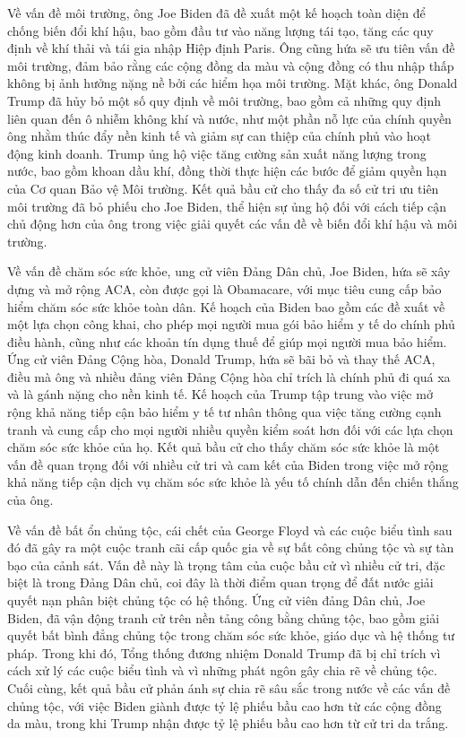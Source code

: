 \documentclass[14pt, a4paper]{article}
\numberwithin{equation}{section}
\numberwithin{figure}{section}
\numberwithin{dl}{section}
\numberwithin{md}{section}
\numberwithin{bd}{section}
\numberwithin{dn}{section}
\numberwithin{hq}{section}
\begin{document}
    Về vấn đề môi trường, ông Joe Biden đã đề xuất một kế hoạch toàn diện để chống biến đổi khí hậu, bao gồm đầu tư vào năng lượng tái tạo, tăng các quy định về khí thải và tái gia nhập Hiệp định Paris. 
    Ông cũng hứa sẽ ưu tiên vấn đề môi trường, đảm bảo rằng các cộng đồng da màu và cộng đồng có thu nhập thấp không bị ảnh hưởng nặng nề bởi các hiểm họa môi trường.
    Mặt khác, ông Donald Trump đã hủy bỏ một số quy định về môi trường, bao gồm cả những quy định liên quan đến ô nhiễm không khí và nước, như một phần nỗ lực của chính quyền ông nhằm thúc đẩy nền kinh tế và giảm sự can thiệp của chính phủ vào hoạt động kinh doanh. 
    Trump ủng hộ việc tăng cường sản xuất năng lượng trong nước, bao gồm khoan dầu khí, đồng thời thực hiện các bước để giảm quyền hạn của Cơ quan Bảo vệ Môi trường.
    Kết quả bầu cử cho thấy đa số cử tri ưu tiên môi trường đã bỏ phiếu cho Joe Biden, thể hiện sự ủng hộ đối với cách tiếp cận chủ động hơn của ông trong việc giải quyết các vấn đề về biến đổi khí hậu và môi trường.

    Về vấn đề chăm sóc sức khỏe, ung cử viên Đảng Dân chủ, Joe Biden, hứa sẽ xây dựng và mở rộng ACA, còn được gọi là Obamacare, với mục tiêu cung cấp bảo hiểm chăm sóc sức khỏe toàn dân. 
    Kế hoạch của Biden bao gồm các đề xuất về một lựa chọn công khai, cho phép mọi người mua gói bảo hiểm y tế do chính phủ điều hành, cũng như các khoản tín dụng thuế để giúp mọi người mua bảo hiểm.
    Ứng cử viên Đảng Cộng hòa, Donald Trump, hứa sẽ bãi bỏ và thay thế ACA, điều mà ông và nhiều đảng viên Đảng Cộng hòa chỉ trích là chính phủ đi quá xa và là gánh nặng cho nền kinh tế. 
    Kế hoạch của Trump tập trung vào việc mở rộng khả năng tiếp cận bảo hiểm y tế tư nhân thông qua việc tăng cường cạnh tranh và cung cấp cho mọi người nhiều quyền kiểm soát hơn đối với các lựa chọn chăm sóc sức khỏe của họ.
    Kết quả bầu cử cho thấy chăm sóc sức khỏe là một vấn đề quan trọng đối với nhiều cử tri và cam kết của Biden trong việc mở rộng khả năng tiếp cận dịch vụ chăm sóc sức khỏe là yếu tố chính dẫn đến chiến thắng của ông.

    Về vấn đề bất ổn chủng tộc, cái chết của George Floyd và các cuộc biểu tình sau đó đã gây ra một cuộc tranh cãi cấp quốc gia về sự bất công chủng tộc và sự tàn bạo của cảnh sát. 
    Vấn đề này là trọng tâm của cuộc bầu cử vì nhiều cử tri, đặc biệt là trong Đảng Dân chủ, coi đây là thời điểm quan trọng để đất nước giải quyết nạn phân biệt chủng tộc có hệ thống. 
    Ứng cử viên đảng Dân chủ, Joe Biden, đã vận động tranh cử trên nền tảng công bằng chủng tộc, bao gồm giải quyết bất bình đẳng chủng tộc trong chăm sóc sức khỏe, giáo dục và hệ thống tư pháp. 
    Trong khi đó, Tổng thống đương nhiệm Donald Trump đã bị chỉ trích vì cách xử lý các cuộc biểu tình và vì những phát ngôn gây chia rẽ về chủng tộc. Cuối cùng, kết quả bầu cử phản ánh sự chia rẽ sâu sắc trong nước về các vấn đề chủng tộc, với việc Biden giành được tỷ lệ phiếu bầu cao hơn từ các cộng đồng da màu, trong khi Trump nhận được tỷ lệ phiếu bầu cao hơn từ cử tri da trắng.
\end{document}
